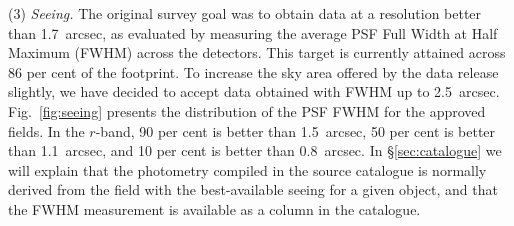 \documentclass[a4paper,useAMS,usenatbib]{mn2e}
\begin{document}
(3) \emph{Seeing.} 
The original survey goal was to obtain data 
at a resolution better than 1.7~arcsec,
as evaluated by measuring the average PSF Full Width at Half Maximum (FWHM)
across the detectors.
This target is currently attained across 86 per cent of the footprint.
To increase the sky area offered by the data release slightly,
we have decided to accept data obtained with FWHM up to 2.5~arcsec.
Fig.~\ref{fig:seeing} presents the distribution
of the PSF FWHM for the approved fields.
In the $r$-band, 90 per cent is better than 1.5~arcsec,
50 per cent is better than 1.1~arcsec,
and 10 per cent is better than 0.8~arcsec.
In \S\ref{sec:catalogue} we will explain
that the photometry compiled in the source catalogue
is normally derived from the field with the
best-available seeing for a given object,
and that the FWHM measurement
is available as a column in the catalogue.
\end{document}
